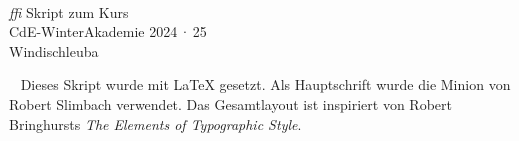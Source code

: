 \begin{titlepage}
  \centering\large
  ~
  \vfill  
  \textcolor{Maroon}{} \\ \medskip
  \vfill
  {\fontsize{180}{60}\selectfont \textcolor{black!20}{\emph{ffi}}}
  \vfill
  Skript zum Kurs\\
  CdE-WinterAkademie 2024\,·\,25\\
  Windischleuba
  \vfill
\end{titlepage}

\thispagestyle{empty}%
~%
\vfill%
\noindent Dieses Skript wurde mit \LaTeX{} gesetzt. Als Hauptschrift
wurde die Minion von Robert Slimbach verwendet. Das Gesamtlayout ist
\mbox{inspiriert} von Robert Bringhursts \emph{The Elements of
  Typographic Style}.
\cleardoublepage

